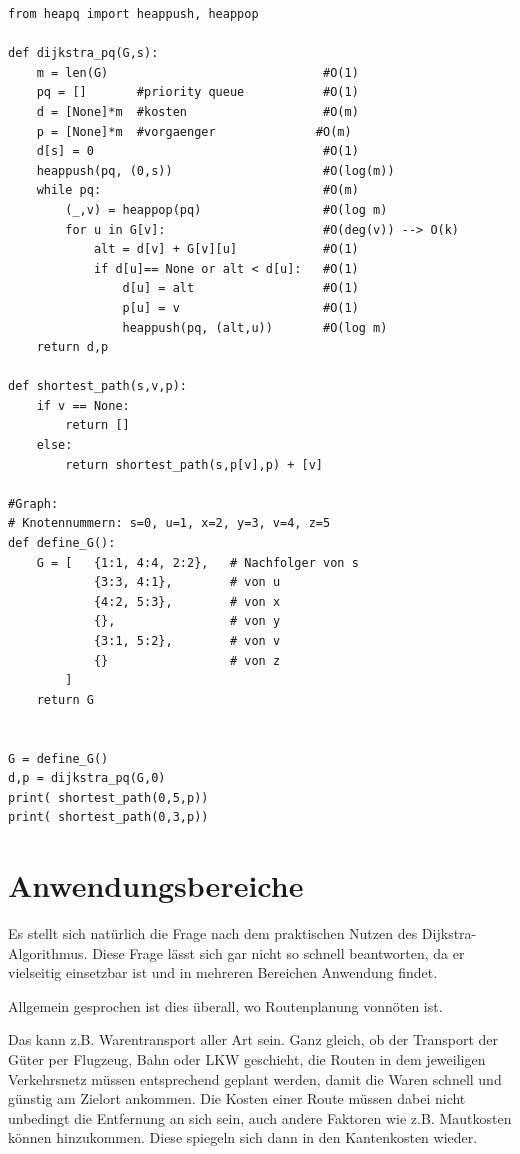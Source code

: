 \lstset{language=Python}
\begin{lstlisting}
from heapq import heappush, heappop

def dijkstra_pq(G,s):
    m = len(G)                              #O(1)
    pq = []       #priority queue           #O(1)
    d = [None]*m  #kosten                   #O(m)
    p = [None]*m  #vorgaenger		       #O(m)
    d[s] = 0                                #O(1)
    heappush(pq, (0,s))                     #O(log(m))
    while pq:                               #O(m)
        (_,v) = heappop(pq)                 #O(log m)
        for u in G[v]:                      #O(deg(v)) --> O(k)  
            alt = d[v] + G[v][u]            #O(1)
            if d[u]== None or alt < d[u]:   #O(1)
                d[u] = alt		            #O(1)	
               	p[u] = v                    #O(1)
                heappush(pq, (alt,u))       #O(log m)        
    return d,p

def shortest_path(s,v,p):
	if v == None:
		return []
	else:
		return shortest_path(s,p[v],p) + [v]
 
#Graph: 
# Knotennummern: s=0, u=1, x=2, y=3, v=4, z=5    
def define_G():
    G = [   {1:1, 4:4, 2:2},   # Nachfolger von s
            {3:3, 4:1},        # von u
            {4:2, 5:3},        # von x
            {},                # von y
            {3:1, 5:2},        # von v
            {}                 # von z
        ]
    return G


G = define_G()
d,p = dijkstra_pq(G,0)
print( shortest_path(0,5,p))
print( shortest_path(0,3,p))
\end{lstlisting}

\section{Anwendungsbereiche}
Es stellt sich natürlich die Frage nach dem praktischen Nutzen des Dijkstra-Algorithmus. Diese Frage lässt sich gar nicht so schnell beantworten, da er vielseitig einsetzbar ist und in mehreren Bereichen Anwendung findet.

\parindent0pt Allgemein gesprochen ist dies überall, wo Routenplanung vonnöten ist.

\parindent0pt
Das kann z.B. Warentransport aller Art sein. Ganz gleich, ob der Transport der Güter per Flugzeug, Bahn oder LKW geschieht, die Routen in dem jeweiligen Verkehrsnetz müssen entsprechend geplant werden, damit die Waren schnell und günstig am Zielort ankommen. Die Kosten einer Route müssen dabei nicht unbedingt die Entfernung an sich sein, auch andere Faktoren wie z.B. Mautkosten können hinzukommen. Diese spiegeln sich dann in den Kantenkosten wieder.

